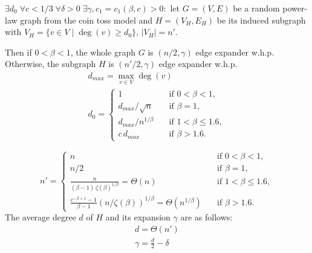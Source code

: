 \documentclass{beamer}
\newcommand{\autotitle}{\secname\ifdefempty{\subsecname}{}{~--- \subsecname}}
\begin{document}
\begin{frame}{\autotitle}
    \small
    \begin{theorem}
        $\exists d_0\;\forall c<1/3\;\forall\delta>0\;\exists\gamma,c_1=c_1(\beta,c)>0:$
        let $G=(V,E)$ be a random power-law graph from the coin toss model
        and $H=(V_H,E_H)$ be its induced subgraph
        with $V_H=\{v\in V\;|\;\deg(v)\geq d_0\}$, $|V_H|=n'$.
        
        Then if $0<\beta<1$, the whole graph $G$ is $(n/2,\gamma)$ edge expander w.h.p.
        Otherwise, the subgraph $H$ is $(n'/2,\gamma)$ edge expander w.h.p.
        \begin{gather*}
            d_{max}=\max_{v\in V}{\deg(v)}\\
            d_0=
            \begin{cases}
                1 & \quad \text{if } 0<\beta<1,\\
                d_{max}/\sqrt{n} & \quad \text{if } \beta=1,\\
                d_{max}/n^{1/\beta} & \quad \text{if } 1<\beta\leq 1.6,\\
                c\,d_{max} & \quad \text{if } \beta>1.6.
            \end{cases}
        \end{gather*}
    \end{theorem}
\end{frame}

\begin{frame}{\autotitle}
    \small
    \begin{theorem}[Cont.]
        \begin{equation*}
            n'=
            \begin{cases}
                n & \quad \text{if } 0<\beta<1,\\
                n/2 & \quad \text{if } \beta=1,\\
                \frac{n}{(\beta-1)\,\zeta(\beta)^{1/\beta}}=\Theta(n) & \quad \text{if } 1<\beta\leq 1.6,\\
                \frac{c^{-\beta+1}-1}{\beta-1}\left(n/\zeta(\beta)\right)^{1/\beta}=\Theta\left(n^{1/\beta}\right) & \quad \text{if } \beta>1.6.
            \end{cases}
        \end{equation*}
        The average degree $d$ of $H$ and its expansion $\gamma$ are as follows:
        \begin{gather*}
            d=\Theta(n')\\
            \gamma=\frac{d}{2}-\delta
        \end{gather*}
    \end{theorem}
\end{frame}
\end{document}
